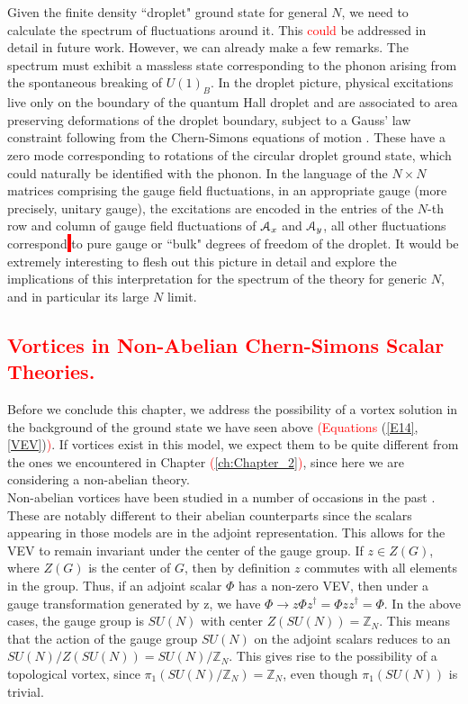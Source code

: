 Given the finite density ``droplet" ground state for general $N$, we need to calculate the spectrum of fluctuations around it. This \textcolor{red}{could} be addressed in detail in future work. However, we can already make a few remarks.  The spectrum must exhibit a massless state corresponding to the phonon arising from the spontaneous breaking of $U(1)_B$. In the droplet picture,  physical excitations live only on the boundary of the quantum Hall droplet and are associated to area preserving deformations of the droplet boundary, subject to a Gauss' law constraint following from the Chern-Simons equations of motion \cite{Polychronakos:2001mi}.  These have a zero mode corresponding to rotations of the circular droplet ground state, which could naturally be identified with the phonon.  In the language of the $N\times N$ matrices comprising the gauge field fluctuations, in an appropriate gauge (more precisely, unitary gauge), the excitations are encoded in the entries of the $N$-th row and column of gauge field fluctuations of ${\cal A}_x$ and ${\cal A}_y$, all other fluctuations correspond\colorbox{red}{ } to pure gauge or ``bulk" degrees of freedom  of the droplet. 
It would be extremely interesting to flesh out this picture in detail and explore the implications of this interpretation for the spectrum of the theory for generic $N$, and in particular its large $N$ limit.
\textcolor{red}{\section{Vortices in Non-Abelian Chern-Simons \textcolor{red}{S}calar \textcolor{red}{T}heories.}}
Before we conclude this chapter, we address the possibility of a vortex solution in the background of the ground state we have seen above \textcolor{red}{(Equations} (\ref{E14}, \ref{VEV})\textcolor{red}{)}. If vortices exist in this model, we expect them to be quite different from the ones we encountered in Chapter \textcolor{red}{(\ref{ch:Chapter_2})}, since here we are considering a non-abelian theory. \\
\indent Non-abelian vortices have been studied in a number of occasions in the past \cite{deVega:1986eu, Kumar:1986yz, Blazquez-Salcedo:2013roa, NavarroLerida:2009dm}. These are notably different to their abelian counterparts since the scalars appearing in those models are in the adjoint representation. This allows for the VEV to remain invariant under the center of the gauge group. If $z\in Z(G)$, where $Z(G)$ is the center of $G$, then by definition $z$ commutes with all elements in the group. Thus, if an adjoint scalar $\Phi$ has a non-zero VEV, then under a gauge transformation generated by z, we have $\Phi \rightarrow z\Phi z^{\dag} =\Phi z z^{\dag} = \Phi$. In the above cases, the gauge group is $SU(N)$ with center $Z(SU(N)) =\mathbb{Z}_N$. This means that the action of the gauge group $SU(N)$ on the adjoint scalars reduces to an $SU(N)/Z(SU(N))= SU(N)/\mathbb{Z}_N$. This gives rise to the possibility of a topological vortex, since $\pi_1(SU(N)/\mathbb{Z}_N)=\mathbb{Z}_N$, even though $\pi_1(SU(N))$ is trivial.\\
